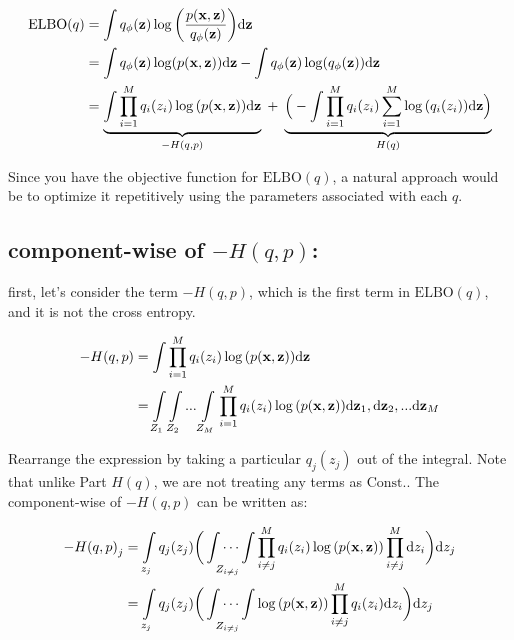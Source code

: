 \documentclass{article}
\def\C{\text{Const.}}
\begin{document}
\begin{equation}\begin{split}
\text{ELBO}(q) 
&= \int q_\phi({\mathbf z}) \log{  \left(   \frac{p({\mathbf x},{\mathbf z})}{q_\phi({\mathbf z})}  \right)  } \text{d} {\mathbf z}\\
&= \int q_\phi({\mathbf z}) \log( p({\mathbf x},{\mathbf z}) )  \text{d} {\mathbf z}  -  \int q_\phi({\mathbf z}) \log (q_\phi({\mathbf z}))  \text{d} {\mathbf z}\\
 &= \underbrace{ \int \prod_{i=1}^M q_i(z_i)\log{(p({\mathbf x}, {\mathbf z}))} \text{d} {\mathbf z}}_{- H(q,p)} \; + \; \underbrace{\Big( - \int \prod_{i=1}^M q_i(z_i)\sum_{i=1}^M \log { (q_i(z_i))}\text{d} {\mathbf z} \Big)}_{H(q)}\\
 \end{split}\end{equation}


Since you have the objective function for $\text{ELBO}(q) $, a natural approach would be to optimize it repetitively using the parameters associated with each $q$.


\subsection{component-wise of $- H(q,p)$:}

first, let's consider the term $- H(q,p)$, which is the first term in $\text{ELBO}(q)$, and it is not the cross entropy.

\begin{equation}\begin{split}
- H(q,p) &= \int \prod_{i=1}^M q_i(z_i) \log{(p({\mathbf x},{\mathbf z}))} \text{d} {\mathbf z}\\
&=\int\limits_{Z_1} \int\limits_{Z_2}... \int\limits_{Z_M}  \prod_{i=1}^M q_i(z_i)  \log{(p({\mathbf x},{\mathbf z}))} \text{d} {\mathbf z}_1, \text{d} {\mathbf z}_2, ... \text{d} {\mathbf z}_M
 \end{split}\end{equation}


Rearrange the expression by taking a particular $q_j(z_j)$ out of the integral. Note that unlike Part $H(q)$, we are not treating any terms as $\C$. The component-wise of $- H(q,p)$ can be written as:


\begin{equation}\begin{split}
{- H(q,p)}_{j} 
&= \int\limits_{z_j} q_j(z_j) \bigg(  \idotsint\limits_{Z_{i \neq j}} \prod_{ i \neq j}^M q_i(z_i) \log{(p({\mathbf x},{\mathbf z}))} \prod_{ i \neq j}^M \text{d} z_i \bigg)  \text{d} z_j\\
&= \int\limits_{z_j} q_j(z_j) \bigg(  \idotsint\limits_{Z_{i \neq j}}  \log{(p({\mathbf x},{\mathbf z}))} \prod_{ i \neq j}^M q_i(z_i)\text{d} z_i  \bigg)  \text{d} z_j
 \end{split}\end{equation}
\end{document}
